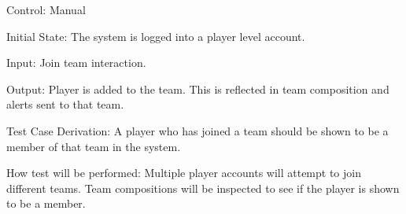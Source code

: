 \documentclass[12pt, titlepage]{article}
\begin{document}
\begin{enumerate}
  Control: Manual

  Initial State: The system is logged into a player level account.

  Input: Join team interaction.

  Output: Player is added to the team. This is reflected in team composition
  and alerts sent to that team.

  Test Case Derivation: A player who has joined a team should be shown to be a
  member of that team in the system.

  How test will be performed: Multiple player accounts will attempt to join 
  different teams. Team compositions will be inspected to see if the player
  is shown to be a member. 








\end{enumerate}




\end{document}
